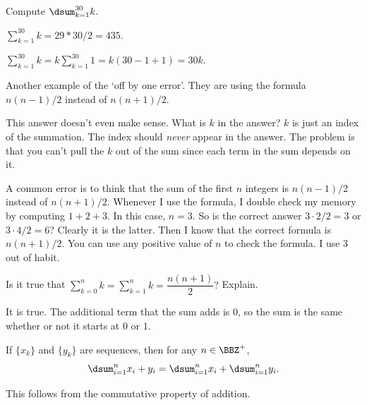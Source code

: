\begin{eval}
Compute $\dsum_{k=1}^{30} k.$
\begin{ssolenum}
\item
${\displaystyle \sum_{k=1}^{30} k=29*30/2=435.}$

\noindent
\evallinetwo
\item
${\displaystyle \sum_{k=1}^{30} k=k\sum_{k=1}^{30}1 = k(30-1+1)=30k.}$

\noindent
\evallinetwo
\end{ssolenum}
\begin{answer}
\begin{solevalenum}
\item
Another example of the `off by one error'.  They are using the formula $n(n-1)/2$ 
instead of $n(n+1)/2$.
\item
This answer doesn't even make sense.  What is $k$ in the answer?  $k$ is just an
index of the summation.  The index should {\em never} appear in the answer.
The problem is that you can't pull the $k$ out of the sum since each term in the
sum depends on it.  
\end{solevalenum}
\end{answer}
\end{eval}

\begin{rem}
A common error is to think that the sum of the first $n$ integers is $n(n-1)/2$ 
instead of $n(n+1)/2$.  Whenever I use the formula, I double check my memory by
computing $1+2+3$.  In this case, $n=3$.  So is the correct answer $3\cdot 2/2=3$
or $3\cdot 4/2=6$?  Clearly it is the latter.  Then I know that the correct
formula is $n(n+1)/2$.  You can use any positive value of $n$ to check the formula.
I use $3$ out of habit.
\end{rem}


\begin{ques}
Is it true that $\displaystyle\sum_{k=0}^{n} k = \sum_{k=1}^{n} k = \dfrac{n(n+1)}{2}?$
Explain.

\noindent
\answerline
\begin{answer}
It is true.  The additional term that the sum adds is $0$, so the sum is the same whether
or not it starts at $0$ or $1$.
\end{answer}
\end{ques}


\begin{thm}
If $\{x_k\}$ and $\{y_k\}$ are sequences, then for any $n\in\BBZ^+$, 
$$\dsum_{i=1}^n x_i+y_i = \dsum_{i=1}^n x_i+\dsum_{i=1}^n y_i.$$
\begin{pf}
This follows from the commutative property of addition.
\end{pf}
\end{thm}

